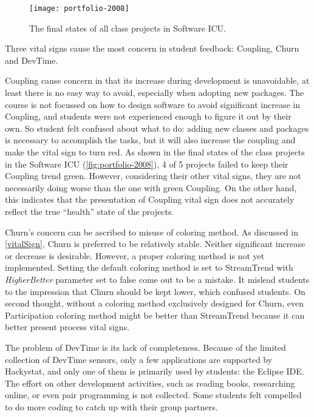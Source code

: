 \begin{figure}[htbp] %
   \centering
   \texttt{[image: portfolio-2008]} 
   \caption{The final states of all class projects in Software ICU.}
   \label{fig:portfolio-2008}
\end{figure}

Three vital signs cause the most concern in student feedback: Coupling, Churn and DevTime.

Coupling cause concern in that its increase during development is unavoidable, at least there is no easy way to avoid, especially when adopting new packages. The course is not focussed on how to design software to avoid significant increase in Coupling, and students were not experienced enough to figure it out by their own. So student felt confused about what to do: adding new classes and packages is necessary to accomplish the tasks, but it will also increase the coupling and make the vital sign to turn red. As shown in the final states of the class projects in the Software ICU (\autoref{fig:portfolio-2008}), 4 of 5 projects failed to keep their Coupling trend green. However, considering their other vital signs, they are not necessarily doing worse than the one with green Coupling. On the other hand, this indicates that the presentation of Coupling vital sign does not accurately reflect the true ``health'' state of the projects.  

Churn's concern can be ascribed to misuse of coloring method. As discussed in \autoref{vitalSign}, Churn is preferred to be relatively stable. Neither significant increase or decrease is desirable. However, a proper coloring method is not yet implemented. Setting the default coloring method is set to StreamTrend with {\it HigherBetter} parameter set to false come out to be a mistake. It mislead students to the impression that Churn should be kept lower, which confused students. On second thought, without a coloring method exclusively designed for Churn, even Participation coloring method might be better than StreamTrend because it can better present process vital signs.

The problem of DevTime is its lack of completeness. Because of the limited collection of DevTime sensors, only a few applications are supported by Hackystat, and only one of them is primarily used by students: the Eclipse IDE. The effort on other development activities, such as reading books, researching online, or even pair programming is not collected. Some students felt compelled to do more coding to catch up with their group partners.


